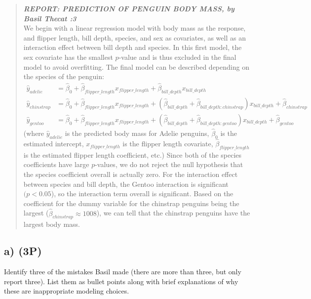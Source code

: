 \documentclass[
]{article}
\begin{document}
\begin{quote}
\textbf{\emph{REPORT: PREDICTION OF PENGUIN BODY MASS, by Basil Thecat
:3}}\\
We begin with a linear regression model with body mass as the response,
and flipper length, bill depth, species, and sex as covariates, as well
as an interaction effect between bill depth and species. In this first
model, the sex covariate has the smallest \(p\)-value and is thus
excluded in the final model to avoid overfitting. The final model can be
described depending on the species of the penguin: \[
\begin{aligned}
\hat{y}_{adelie} &= \hat\beta_0 + \hat\beta_{flipper\_length} x_{flipper\_length} +      \hat\beta_{bill\_depth} x_{bill\_depth} \\
\hat{y}_{chinstrap} &= \hat\beta_0 + \hat\beta_{flipper\_length} x_{flipper\_length} + (\hat\beta_{bill\_depth} + \hat\beta_{bill\_depth:chinstrap}) x_{bill\_depth} + \hat\beta_{chinstrap} \\
\hat{y}_{gentoo} &= \hat\beta_0 + \hat\beta_{flipper\_length} x_{flipper\_length} + (\hat\beta_{bill\_depth} + \hat\beta_{bill\_depth:gentoo}) x_{bill\_depth} + \hat\beta_{gentoo} 
\end{aligned}
\] (where \(\hat y_{adelie}\) is the predicted body mass for Adelie
penguins, \(\hat\beta_0\) is the estimated intercept,
\(x_{flipper\_length}\) is the flipper length covariate,
\(\hat\beta_{flipper\_length}\) is the estimated flipper length
coefficient, etc.) Since both of the species coefficients have large
\(p\)-values, we do not reject the null hypothesis that the species
coefficient overall is actually zero. For the interaction effect between
species and bill depth, the Gentoo interaction is significant
\((p<0.05\)), so the interaction term overall is significant. Based on
the coefficient for the dummy variable for the chinstrap penguins being
the largest (\(\hat\beta_{chinstrap} \approx 1008\)), we can tell that
the chinstrap penguins have the largest body mass.
\end{quote}

\hypertarget{a-3p}{%
\subsection{a) (3P)}\label{a-3p}}

Identify three of the mistakes Basil made (there are more than three,
but only report three). List them as bullet points along with brief
explanations of why these are inappropriate modeling choices.
\end{document}
